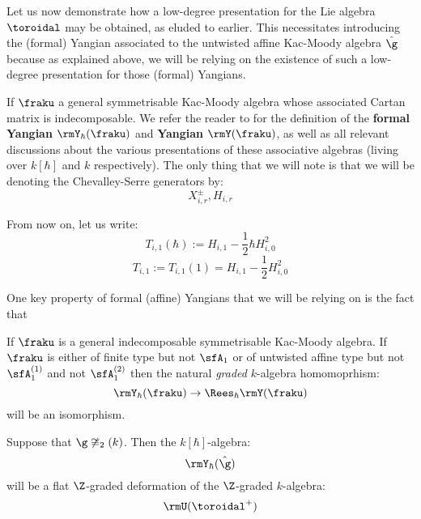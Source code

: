 Let us now demonstrate how a low-degree presentation for the Lie algebra $\toroidal$ may be obtained, as eluded to earlier. This necessitates introducing the (formal) Yangian associated to the untwisted affine Kac-Moody algebra $\hat{\g}$ because as explained above, we will be relying on the existence of such a low-degree presentation for those (formal) Yangians.
        \begin{convention}
            If $\fraku$ a general symmetrisable Kac-Moody algebra whose associated Cartan matrix is indecomposable. We refer the reader to \cite[Section 2]{guay_nakajima_wendlandt_affine_yangian_coproduct} for the definition of the \textbf{formal Yangian} $\rmY_{\hbar}(\fraku)$ and \textbf{Yangian} $\rmY(\fraku)$, as well as all relevant discussions about the various  presentations of these associative algebras (living over $k[\hbar]$ and $k$ respectively). The only thing that we will note is that we will be denoting the Chevalley-Serre generators by:
                $$X_{i, r}^{\pm}, H_{i, r}$$
        \end{convention}
        \begin{convention}
            From now on, let us write:
                $$T_{i, 1}(\hbar) := H_{i, 1} - \frac12 \hbar H_{i, 0}^2$$
                $$T_{i, 1} := T_{i, 1}(1) = H_{i, 1} - \frac12 H_{i, 0}^2$$
        \end{convention}

        One key property of formal (affine) Yangians that we will be relying on is the fact that 
        \begin{lemma} \label{lemma: formal_yangians_as_rees_algebras}
            \cite[Theorem 6.10]{guay_nakajima_wendlandt_affine_yangian_vertex_representations_and_PBW} If $\fraku$ is a general indecomposable symmetrisable Kac-Moody algebra. If $\fraku$ is either of finite type but not $\sfA_1$ or of untwisted affine type but not $\sfA_1^{(1)}$ and not $\sfA_1^{(2)}$ then the natural \textit{graded} $k$-algebra homomoprhism:
                $$\rmY_{\hbar}(\fraku) \to \Rees_{\hbar} \rmY(\fraku)$$
            will be an isomorphism. 
        \end{lemma}
         \begin{corollary} \label{coro: formal_affine_yangians_as_flat_graded_deformations}
            Suppose that $\g \not \cong \sl_2(k)$. Then the $k[\hbar]$-algebra:
                $$\rmY_{\hbar}(\hat{\g})$$
            will be a flat $\Z$-graded deformation of the $\Z$-graded $k$-algebra:
                $$\rmU(\toroidal^+)$$
         \end{corollary}
         
